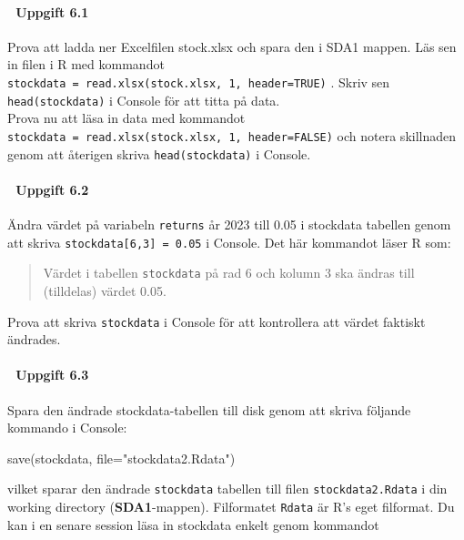 \documentclass[
  letterpaper,
  DIV=11,
  numbers=noendperiod,
  oneside]{scrartcl}
\let\oldparagraph\paragraph
\renewcommand{\paragraph}[1]{\oldparagraph{#1}\mbox{}}
\newenvironment{Shaded}{\begin{snugshade}}{\end{snugshade}}
\newcommand{\AttributeTok}[1]{\textcolor[rgb]{0.40,0.45,0.13}{#1}}
\newcommand{\FunctionTok}[1]{\textcolor[rgb]{0.28,0.35,0.67}{#1}}
\newcommand{\NormalTok}[1]{\textcolor[rgb]{0.00,0.23,0.31}{#1}}
\newcommand{\StringTok}[1]{\textcolor[rgb]{0.13,0.47,0.30}{#1}}
\begin{document}
\hypertarget{uppgift-6.1}{%
\paragraph{💪 Uppgift 6.1}\label{uppgift-6.1}}

Prova att ladda ner Excelfilen stock.xlsx och spara den i SDA1 mappen.
Läs sen in filen i R med kommandot
\texttt{stockdata\ =\ read.xlsx(\textquotesingle{}stock.xlsx\textquotesingle{},\ 1,\ header=TRUE)}
. Skriv sen \texttt{head(stockdata)} i Console för att titta på data.\\
Prova nu att läsa in data med kommandot
\texttt{stockdata\ =\ read.xlsx(\textquotesingle{}stock.xlsx\textquotesingle{},\ 1,\ header=FALSE)}
och notera skillnaden genom att återigen skriva \texttt{head(stockdata)}
i Console.

\hypertarget{uppgift-6.2}{%
\paragraph{💪 Uppgift 6.2}\label{uppgift-6.2}}

Ändra värdet på variabeln \texttt{returns} år 2023 till 0.05 i stockdata
tabellen genom att skriva \texttt{stockdata{[}6,3{]}\ =\ 0.05} i
Console. Det här kommandot läser R som:

\begin{quote}
Värdet i tabellen \texttt{stockdata} på rad 6 och kolumn 3 ska ändras
till (tilldelas) värdet 0.05.
\end{quote}

Prova att skriva \texttt{stockdata} i Console för att kontrollera att
värdet faktiskt ändrades.

\hypertarget{uppgift-6.3}{%
\paragraph{💪 Uppgift 6.3}\label{uppgift-6.3}}

Spara den ändrade stockdata-tabellen till disk genom att skriva följande
kommando i Console:

\begin{Shaded}
\begin{Highlighting}[]
\FunctionTok{save}\NormalTok{(stockdata, }\AttributeTok{file=}\StringTok{"stockdata2.Rdata"}\NormalTok{)}
\end{Highlighting}
\end{Shaded}

vilket sparar den ändrade \texttt{stockdata} tabellen till filen
\texttt{stockdata2.Rdata} i din working directory
(\textbf{SDA1}-mappen). Filformatet \texttt{Rdata} är R's eget
filformat. Du kan i en senare session läsa in stockdata enkelt genom
kommandot
\end{document}
